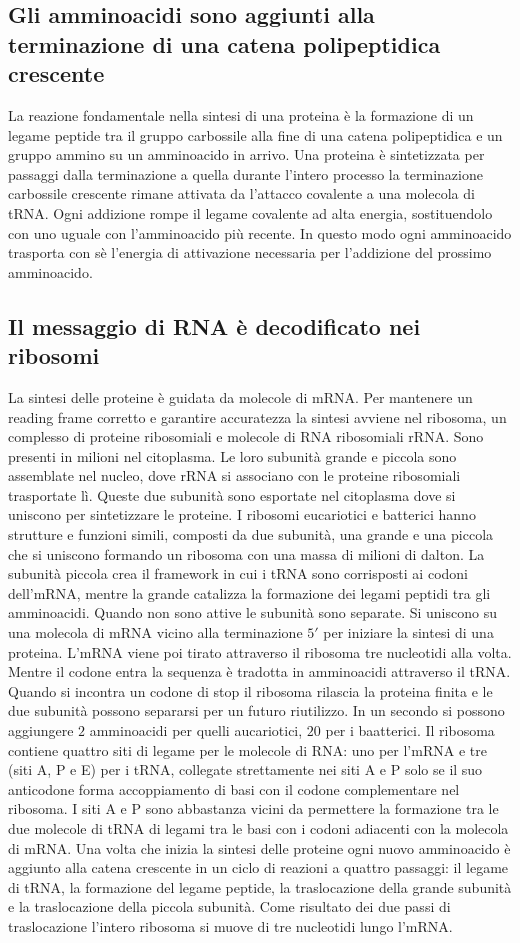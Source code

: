 \subsection{Gli amminoacidi sono aggiunti alla terminazione  di una catena polipeptidica crescente}
La reazione fondamentale nella sintesi di una proteina \`e la formazione di un legame peptide tra il gruppo carbossile alla fine di una catena polipeptidica e un gruppo ammino su un 
amminoacido in arrivo. Una proteina \`e sintetizzata per passaggi dalla terminazione  a quella  durante l'intero processo la terminazione carbossile crescente rimane
attivata da l'attacco covalente a una molecola di tRNA. Ogni addizione rompe il legame covalente ad alta energia, sostituendolo con uno uguale con l'amminoacido pi\`u recente. In
questo modo ogni amminoacido trasporta con s\`e l'energia di attivazione necessaria per l'addizione del prossimo amminoacido. 
\subsection{Il messaggio di RNA \`e decodificato nei ribosomi}
La sintesi delle proteine \`e guidata da molecole di mRNA. Per mantenere un reading frame corretto e garantire accuratezza la sintesi avviene nel ribosoma, un complesso di proteine
ribosomiali e molecole di RNA ribosomiali rRNA. Sono presenti in milioni nel citoplasma. Le loro subunit\`a grande e piccola sono assemblate nel nucleo, dove rRNA si associano con le 
proteine ribosomiali trasportate l\`i. Queste due subunit\`a sono esportate nel citoplasma dove si uniscono per sintetizzare le proteine. I ribosomi eucariotici e batterici hanno
strutture e funzioni simili, composti da due subunit\`a, una grande e una piccola che si uniscono formando un ribosoma con una massa di milioni di dalton. La subunit\`a piccola 
crea il framework in cui i tRNA sono corrisposti ai codoni dell'mRNA, mentre la grande catalizza la formazione dei legami peptidi tra gli amminoacidi. Quando non sono attive le 
subunit\`a sono separate. Si uniscono su una molecola di mRNA vicino alla terminazione $5'$ per iniziare la sintesi di una proteina. L'mRNA viene poi tirato attraverso il ribosoma tre
nucleotidi alla volta. Mentre il codone entra la sequenza \`e tradotta in amminoacidi attraverso il tRNA. Quando si incontra un codone di stop il ribosoma rilascia la proteina finita e 
le due subunit\`a possono separarsi per un futuro riutilizzo. In un secondo si possono aggiungere $2$ amminoacidi per quelli aucariotici, $20$ per i baatterici. Il ribosoma contiene
quattro siti di legame per le molecole di RNA: uno per l'mRNA e tre (siti A, P e E) per i tRNA, collegate strettamente nei siti A e P solo se il suo anticodone forma accoppiamento di 
basi con il codone complementare nel ribosoma. I siti A e P sono abbastanza vicini da permettere la formazione tra le due molecole di tRNA di legami tra le basi con i codoni adiacenti
con la molecola di mRNA. Una volta che inizia la sintesi delle proteine ogni nuovo amminoacido \`e aggiunto alla catena crescente in un ciclo di reazioni a quattro passaggi: il legame
di tRNA, la formazione del legame peptide, la traslocazione della grande subunit\`a e la traslocazione della piccola subunit\`a. Come risultato dei due passi di traslocazione l'intero
ribosoma si muove di tre nucleotidi lungo l'mRNA.
